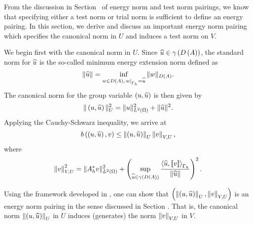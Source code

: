 From the discussion in Section~ of energy norm and test norm pairings, we know that specifying either a test norm or trial norm is sufficient to define an energy pairing. %
In this section, we derive and discuss an important energy norm pairing which specifies the canonical norm in $U$ and induces a test norm on $V$. %

We begin first with the canonical norm in $U$. Since $\uh \in \gamma\LRp{D\LRp{A}}$, the standard norm for $\uh$ is
the so-called minimum energy extension norm defined as
\begin{equation}
\eqnlab{MEnorm}
\|\widehat{u}\| = \inf_{w\in D\LRp{A},
  \left.w\right|_{\Gh}=\widehat{u}} \|w\|_{D\LRp{A}}.
\end{equation}
The canonical norm for the group variable $\LRp{u,\uh}$ is then given by
\[
\|\left(u,\widehat{u}\right)\|_U^2 = \|u\|^2_{\L} + \|\widehat{u}\|^2.
\]
Applying the Cauchy-Schwarz inequality, we arrive at
\[
b\LRp{\LRp{u,\uh},v} \le \nor{\LRp{u,\uh}}_U \nor{v}_{V,U},
\]
where
\[
\nor{v}_{V,U}^2 = \|A_h^*v\|_{\L}^2
+\left(\sup_{\widehat{u} \in \gamma\LRp{D\LRp{A}}} \frac{\LRa{ \widehat{u},
  \jump{v} }_{\Gh}}{\|\widehat{u}\|}\right)^2.
\]


Using the framework developed in \cite{Bui-ThanhDemkowiczGhattas11a}, one can show that $\LRp{\nor{\LRp{u,\uh}}_U,  \nor{v}_{V,U}}$ is an energy norm pairing in the sense discussed in Section . That is, the canonical norm $\nor{\LRp{u,\uh}}_U$ in $U$ induces (generates) the norm $\nor{v}_{V,U}$ in $V$.  

